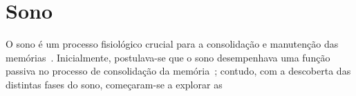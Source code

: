 \section{Sono}

O sono é um processo fisiológico crucial para a consolidação e manutenção das memórias~\cite{blissittSleep2001, walkerSleep2006,
diekelmannMemory2010}. Inicialmente, postulava-se que o sono desempenhava uma função passiva no processo de consolidação da
memória~\cite{jenkinsObliviscence1924}; contudo, com a descoberta das distintas fases do sono, começaram-se a explorar as
